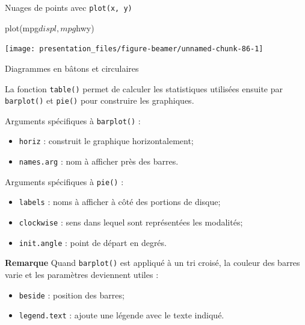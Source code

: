 \documentclass[12pt,handout,ignorenonframetext,]{beamer}
\newenvironment{Shaded}{}{}
\newcommand{\KeywordTok}[1]{\textcolor[rgb]{0.00,0.00,1.00}{#1}}
\newcommand{\OperatorTok}[1]{#1}
\newcommand{\NormalTok}[1]{#1}
\providecommand{\tightlist}{%
  \setlength{\itemsep}{0pt}\setlength{\parskip}{0pt}}
\renewenvironment{Shaded}{\begin{snugshade}}{\end{snugshade}}
\begin{document}
\begin{frame}[fragile]{Nuages de points avec \texttt{plot(x,\ y)}}

\centering \footnotesize

\begin{Shaded}
\begin{Highlighting}[]
\KeywordTok{plot}\NormalTok{(mpg}\OperatorTok{$}\NormalTok{displ, mpg}\OperatorTok{$}\NormalTok{hwy)}
\end{Highlighting}
\end{Shaded}

\texttt{[image: presentation\_files/figure-beamer/unnamed-chunk-86-1]}

\end{frame}

\begin{frame}[fragile]{Diagrammes en bâtons et circulaires}

La fonction \texttt{table()} permet de calculer les statistiques
utilisées ensuite par \texttt{barplot()} et \texttt{pie()} pour
construire les graphiques.

\pause Arguments spécifiques à \texttt{barplot()} : \vspace{-3mm}

\begin{itemize}
\tightlist
\item
  \texttt{horiz} : construit le graphique horizontalement;
\item
  \texttt{names.arg} : nom à afficher près des barres.
\end{itemize}

\pause Arguments spécifiques à \texttt{pie()} : \vspace{-3mm}

\begin{itemize}
\tightlist
\item
  \texttt{labels} : noms à afficher à côté des portions de disque;
\item
  \texttt{clockwise} : sens dans lequel sont représentées les modalités;
\item
  \texttt{init.angle} : point de départ en degrés.
\end{itemize}

\pause

\textbf{Remarque} Quand \texttt{barplot()} est appliqué à un tri croisé,
la couleur des barres varie et les paramètres deviennent utiles :
\vspace{-3mm}

\begin{itemize}
\tightlist
\item
  \texttt{beside} : position des barres;
\item
  \texttt{legend.text} : ajoute une légende avec le texte indiqué.
\end{itemize}

\end{frame}
\end{document}
